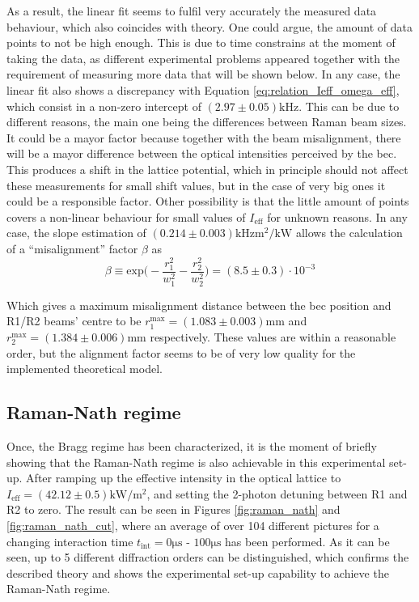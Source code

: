 As a result, the linear fit seems to fulfil very accurately the measured data behaviour, which also coincides with theory. One could argue, the amount of data points to not be high enough. This is due to time constrains at the moment of taking the data, as different experimental problems appeared together with the requirement of measuring more data that will be shown below. In any case, the linear fit also shows a discrepancy with Equation \eqref{eq:relation_Ieff_omega_eff}, which consist in a non-zero intercept of $(2.97\pm0.05)\si{\kilo\hertz}$. This can be due to different reasons, the main one being the differences between Raman beam sizes. It could be a mayor factor because together with the beam misalignment, there will be a mayor difference between the optical intensities perceived by the \ac{bec}. This produces a shift in the lattice potential, which in principle should not affect these measurements for small shift values, but in the case of very big ones it could be a responsible factor. Other possibility is that the little amount of points covers a non-linear behaviour for small values of $I_\text{eff}$ for unknown reasons. In any case, the slope estimation of $(0.214\pm0.003)\si{\kilo\hertz\meter\squared\per\kilo\watt}$ allows the calculation of a ``misalignment'' factor $\beta$ as
\begin{equation*}
	\beta \equiv \text{exp}\bigg(-\frac{r_1^2}{w_1^2}-\frac{r_2^2}{w_2^2}\bigg) = (8.5\pm0.3)\cdot10^{-3}
\end{equation*}

Which gives a maximum misalignment distance between the \ac{bec} position and R1/R2 beams' centre to be $r_1^\text{max} = (1.083 \pm 0.003) \si{\milli\meter}$ and  $r_2^\text{max} = (1.384\pm0.006) \si{\milli\meter}$ respectively. These values are within a reasonable order, but the alignment factor seems to be of very low quality for the implemented theoretical model.

\pagebreak

\subsection{Raman-Nath regime}

Once, the Bragg regime has been characterized, it is the moment of briefly showing that the Raman-Nath regime is also achievable in this experimental set-up. After ramping up the effective intensity in the optical lattice to $I_\text{eff} = (42.12 \pm 0.5)\si{\kilo\watt\per\meter\squared}$, and setting the 2-photon detuning between R1 and R2 to zero. The result can be seen in Figures \ref{fig:raman_nath} and \ref{fig:raman_nath_cut}, where an average of over 104 different pictures for a changing interaction time $t_\text{int} = 0\si{\micro\second}\text{ - }100\si{\micro\second}$ has been performed. As it can be seen, up to 5 different diffraction orders can be distinguished, which confirms the described theory and shows the experimental set-up capability to achieve the Raman-Nath regime.

